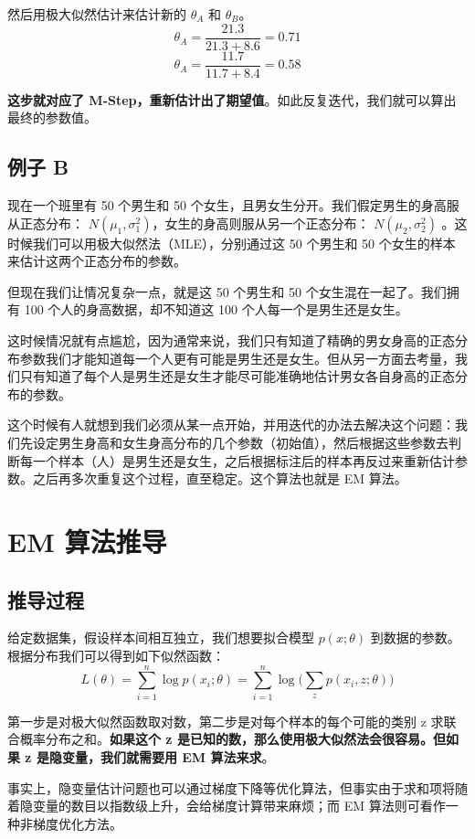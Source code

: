 \documentclass[12pt]{article}
\begin{document}
然后用极大似然估计来估计新的 $\theta_A$  和 $\theta_B$。
$$
\theta_A = \frac{21.3}{21.3+8.6} = 0.71
$$
$$
\theta_A = \frac{11.7}{11.7+8.4} = 0.58
$$

\textbf{这步就对应了 M-Step，重新估计出了期望值}。如此反复迭代，我们就可以算出最终的参数值。

\subsection{例子 B}
现在一个班里有 50 个男生和 50 个女生，且男女生分开。我们假定男生的身高服从正态分布： $N(\mu_1, \sigma_1^2)$，女生的身高则服从另一个正态分布： $N(\mu_2, \sigma_2^2)$ 。这时候我们可以用极大似然法（MLE），分别通过这 50 个男生和 50 个女生的样本来估计这两个正态分布的参数。

但现在我们让情况复杂一点，就是这 50 个男生和 50 个女生混在一起了。我们拥有 100 个人的身高数据，却不知道这 100 个人每一个是男生还是女生。

这时候情况就有点尴尬，因为通常来说，我们只有知道了精确的男女身高的正态分布参数我们才能知道每一个人更有可能是男生还是女生。但从另一方面去考量，我们只有知道了每个人是男生还是女生才能尽可能准确地估计男女各自身高的正态分布的参数。

这个时候有人就想到我们必须从某一点开始，并用迭代的办法去解决这个问题：我们先设定男生身高和女生身高分布的几个参数（初始值），然后根据这些参数去判断每一个样本（人）是男生还是女生，之后根据标注后的样本再反过来重新估计参数。之后再多次重复这个过程，直至稳定。这个算法也就是 EM 算法。

\section{EM 算法推导}
\subsection{推导过程}
给定数据集，假设样本间相互独立，我们想要拟合模型 $p(x;\theta)$ 到数据的参数。根据分布我们可以得到如下似然函数：
$$
L(\theta) = \sum_{i=1}^n\log{p(x_i;\theta)} = \sum_{i=1}^n\log\Big(\sum_zp(x_i, z;\theta)\Big)
$$

第一步是对极大似然函数取对数，第二步是对每个样本的每个可能的类别 z 求联合概率分布之和。\textbf{如果这个 z 是已知的数，那么使用极大似然法会很容易。但如果 z 是隐变量，我们就需要用 EM 算法来求}。

事实上，隐变量估计问题也可以通过梯度下降等优化算法，但事实由于求和项将随着隐变量的数目以指数级上升，会给梯度计算带来麻烦；而 EM 算法则可看作一种非梯度优化方法。
\end{document}
